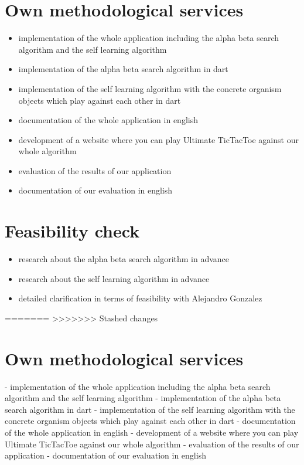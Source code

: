 \section{Own methodological services}
\begin{itemize}
    \item implementation of the whole application including the alpha beta search algorithm and the self learning algorithm
    \item implementation of the alpha beta search algorithm in dart
    \item implementation of the self learning algorithm with the concrete organism objects which play against each other in dart
    \item documentation of the whole application in english
    \item development of a website where you can play Ultimate TicTacToe against our whole algorithm
    \item evaluation of the results of our application
    \item documentation of our evaluation in english
\end{itemize}


\section{Feasibility check}
\begin{itemize}
    \item research about the alpha beta search algorithm in advance
    \item research about the self learning algorithm in advance
    \item detailed clarification in terms of feasibility with Alejandro Gonzalez
\end{itemize}

=======
>>>>>>> Stashed changes

\section{Own methodological services}
- implementation of the whole application including the alpha beta search algorithm and the self learning algorithm
- implementation of the alpha beta search algorithm in dart 
- implementation of the self learning algorithm with the concrete organism objects which play against each other in dart
- documentation of the whole application in english
- development of a website where you can play Ultimate TicTacToe against our whole algorithm
- evaluation of the results of our application
- documentation of our evaluation in english

